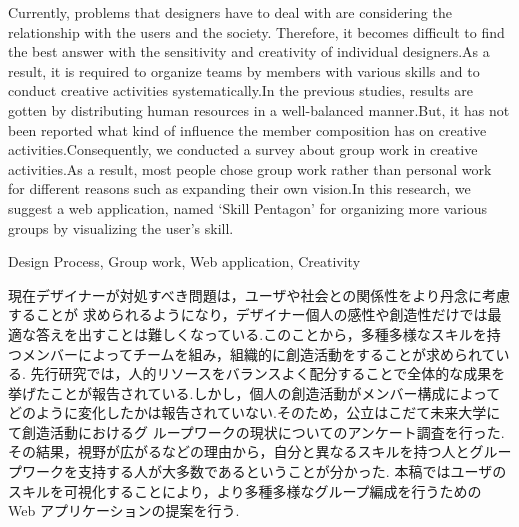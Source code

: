 \documentclass{funthesis}
\begin{document}
\maketitle       %

\begin{eabstract}
Currently, problems that designers have to deal with are considering the relationship with the users and the society. Therefore, it becomes difficult to find the best answer with the sensitivity and creativity of individual designers.As a result, it is required to organize teams by members with various skills and to conduct creative activities systematically.In the previous studies, results are gotten by distributing human resources in a well-balanced manner.But, it has not been reported what kind of influence the member composition has on creative activities.Consequently, we conducted a survey about group work in creative activities.As a result, most people chose group work rather than personal work for different reasons such as expanding their own vision.In this research, we suggest a web application, named ‘Skill Pentagon’ for organizing more various groups by visualizing the user's skill.\end{eabstract}

\begin{ekeyword}
Design Process, Group work, Web application, Creativity
\end{ekeyword}

\begin{jabstract}
現在デザイナーが対処すべき問題は，ユーザや社会との関係性をより丹念に考慮することが 求められるようになり，デザイナー個人の感性や創造性だけでは最適な答えを出すことは難しくなっている.このことから，多種多様なスキルを持つメンバーによってチームを組み，組織的に創造活動をすることが求められている.  先行研究では，人的リソースをバランスよく配分することで全体的な成果を挙げたことが報告されている.しかし，個人の創造活動がメンバー構成によってどのように変化したかは報告されていない.そのため，公立はこだて未来大学にて創造活動におけるグ ループワークの現状についてのアンケート調査を行った.その結果，視野が広がるなどの理由から，自分と異なるスキルを持つ人とグループワークを支持する人が大多数であるということが分かった. 本稿ではユーザのスキルを可視化することにより，より多種多様なグループ編成を行うための Web アプリケーションの提案を行う.
\end{jabstract}
\end{document}
